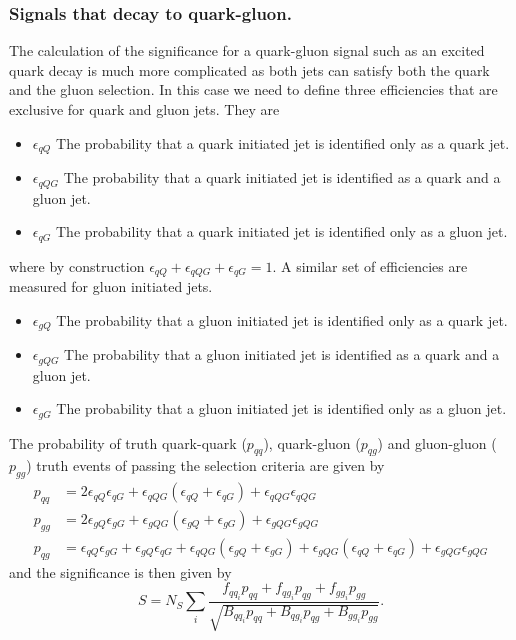 \subsubsection{Signals that decay to quark-gluon.}


The calculation of the significance for a quark-gluon signal such as an excited quark decay is much more complicated as 
both jets can satisfy both the quark and the gluon selection.  In this case we need to define three efficiencies that are exclusive for quark and gluon jets. They are 
\begin{itemize}
\item $\epsilon_{qQ}$ The probability that a quark initiated jet is identified only as a quark jet. 
\item $\epsilon_{qQG}$ The probability that a quark initiated jet is identified  as a quark and a gluon jet.
\item $\epsilon_{qG}$ The probability that a quark initiated jet is identified only as a gluon jet.  
\end{itemize}
where by construction $\epsilon_{qQ} + \epsilon_{qQG} + \epsilon_{qG} = 1$. A similar set of efficiencies are measured 
for gluon initiated jets. 
\begin{itemize}
\item $\epsilon_{gQ}$ The probability that a gluon initiated jet is identified only as a quark jet. 
\item $\epsilon_{gQG}$ The probability that a gluon initiated jet is identified  as a quark and a gluon jet.
\item $\epsilon_{gG}$ The probability that a gluon initiated jet is identified only as a gluon jet.  
\end{itemize}

The probability of truth quark-quark ($p_{qq}$), quark-gluon ($p_{qg}$) and gluon-gluon ($p_{gg}$) truth 
events of passing the selection criteria are given by 
\begin{align}
p_{qq} & = 2  \epsilon_{qQ}\epsilon_{qG} + \epsilon_{qQG}\left( \epsilon_{qQ} + \epsilon_{qG} \right)  + \epsilon_{qQG}\epsilon_{qQG} \\
p_{gg} & = 2  \epsilon_{gQ}\epsilon_{gG} + \epsilon_{gQG}\left( \epsilon_{gQ} + \epsilon_{gG} \right)  + \epsilon_{gQG}\epsilon_{gQG} \\
p_{qg} & = \epsilon_{qQ}\epsilon_{gG} + \epsilon_{gQ}\epsilon_{qG} + \epsilon_{qQG}\left( \epsilon_{gQ} + \epsilon_{gG} \right) 
+ \epsilon_{gQG}\left( \epsilon_{qQ} + \epsilon_{qG} \right) 
+ \epsilon_{gQG}\epsilon_{gQG}
\end{align}
and the significance is then given by 
\begin{equation}
S = N_S \sum_i{ \dfrac{ f_{{qq}_i} p_{qq} + f_{{qg}_i}p_{qg} + f_{{gg}_i}p_{gg}  } {\sqrt{ B_{{qq}_i}p_{qq} + B_{{qg}_i}p_{qg} + B_{{gg}_i}p_{gg}  }}}.
\end{equation}

